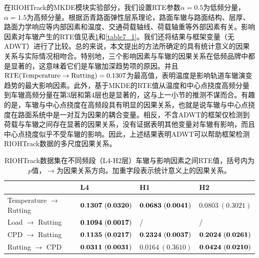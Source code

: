 在RIOHTrack的MKDE模块实验部分，我们设置RTE参数$\alpha=0.5$为低频分量，$\alpha=1.5$为高频分量。根据沥青路面弹性层系理论，路面车辙与路面结构、层厚、路面力学响应等内部因素和温度、交通荷载轴线、荷载轴重等外部因素有关。影响因素对车辙产生的RTE值见表\ref{table7}和\ref{table7_1}。我们还将结果与框架变量（无ADWT）进行了比较。总的来说，本文提出的方法所确定的具有统计意义的因果关系与实际情况相吻合。特别地，三个影响因素与车辙的因果关系在低频品牌中都是显著的，这意味着它们是车辙加深趋势项的原因。并且$\rm RTE(\rm{Temperature} \rightarrow \rm{Rutting})=0.1307$为最高值，表明温度是影响轨道车辙演变趋势的最大影响因素。此外，基于MKDE的RTE值从温度和中心点挠度高频分量到车辙高频分量在第3层和第4层也是显著的，这与上一小节的推测不谋而合。有趣的是，车辙与中心点挠度在高频段具有明显的因果关系，也就是说车辙与中心点挠度在路面系统中是一对互为因果的耦合变量。相反，不含ADWT的框架仅检测到荷载与车辙之间存在显著的因果关系，没有证据表明其他变量对车辙有影响，而且中心点挠度似乎不受车辙的影响。因此，上述结果表明ADWT可以帮助框架检测RIOHTrack数据的多尺度因果关系。

\begin{table}[!ht]
\fontsize{6}{6}\selectfont
\centering
\caption{RIOHTrack数据集在不同频段（L4-H2层）车辙与影响因素之间RTE值，括号内为$p$值，$\rightarrow$为因果关系方向。加重字段表示统计意义上的因果关系。}
\begin{tabular}{llll}
 \hline
   & L4 &  H1& H2 \\
  \hline
  Temperature $\rightarrow$  Rutting & $\bf{0.1307\ (0.0320)}$ & $\bf{0.0683\ (0.0041)}$&$0.0803\ (0.3021)$ \\
  \hline
  Load $\rightarrow$ Rutting& $\bf{0.1094\ (0.0017)}$ & /\ & /\ \\
  \hline
  CPD $\rightarrow$ Rutting& $\bf{0.1135\ (0.0217)}$ & $\bf{0.2324\ (0.0037)}$&$\bf{0.2024\ (0.0261)}$\\
  \hline
  Rutting $\rightarrow$ CPD& $\bf{0.0311\ (0.0031)}$ & $0.0164\ (0.3610)$&$\bf{0.0424\ (0.0210)}$\\
  \hline
\end{tabular}
\label{table7}
\end{table}

